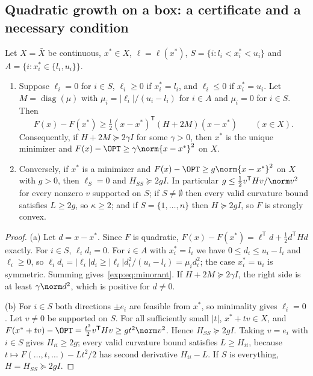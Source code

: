 \subsection{Quadratic growth on a box: a certificate and a necessary condition}

\begin{lemma}\label{exp:lem:growth}
Let $X=\bar X$ be continuous, $x^*\in X$, $\ell=\ell(x^*)$,
$S=\{i:l_i<x^*_i<u_i\}$ and $A=\{i:x^*_i\in\{l_i,u_i\}\}$.
\begin{enumerate}
\item[(a)] Suppose $\ell_i=0$ for $i\in S$, $\ell_i\ge0$ if $x_i^*=l_i$, and
$\ell_i\le0$ if $x^*_i=u_i$. Let $M=\operatorname{diag}(\mu)$ with
$\mu_i=|\ell_i|/(u_i-l_i)$ for $i\in A$ and $\mu_i=0$ for $i\in S$. Then
\begin{equation}\label{exp:eq:minorant}
F(x)-F(x^*)\ge\tfrac12(x-x^*)^{\mathsf T}(H+2M)(x-x^*)\qquad(x\in X).
\end{equation}
Consequently, if $H+2M\succeq2\gamma I$ for some $\gamma>0$, then $x^*$ is the
unique minimizer and $F(x)-\OPT\ge\gamma\norm{x-x^*}^2$ on $X$.
\item[(b)] Conversely, if $x^*$ is a minimizer and
$F(x)-\OPT\ge g\norm{x-x^*}^2$ on $X$ with $g>0$, then $\ell_S=0$ and
$H_{SS}\succeq2gI$. In particular $g\le\frac12v^{\mathsf T}Hv/\norm v^2$ for
every nonzero $v$ supported on $S$; if $S\ne\emptyset$ then every valid
curvature bound satisfies $L\ge2g$, so $\kappa\ge2$; and if $S=\{1,\dots,n\}$
then $H\succeq2gI$, so $F$ is strongly convex.
\end{enumerate}
\end{lemma}

\begin{proof}
(a) Let $d=x-x^*$. Since $F$ is quadratic,
$F(x)-F(x^*)=\ell^{\mathsf T}d+\frac12d^{\mathsf T}Hd$ exactly. For $i\in S$,
$\ell_id_i=0$. For $i\in A$ with $x_i^*=l_i$ we have $0\le d_i\le u_i-l_i$
and $\ell_i\ge0$, so $\ell_id_i=|\ell_i|d_i\ge|\ell_i|d_i^2/(u_i-l_i)=\mu_id_i^2$;
the case $x_i^*=u_i$ is symmetric. Summing gives~\eqref{exp:eq:minorant}. If
$H+2M\succeq2\gamma I$, the right side is at least $\gamma\norm d^2$, which is
positive for $d\ne0$.

(b) For $i\in S$ both directions $\pm e_i$ are feasible from $x^*$, so
minimality gives $\ell_i=0$. Let $v\ne0$ be supported on $S$. For all
sufficiently small $|t|$, $x^*+tv\in X$, and
$F(x^*+tv)-\OPT=\frac{t^2}2v^{\mathsf T}Hv\ge gt^2\norm v^2$. Hence
$H_{SS}\succeq2gI$. Taking $v=e_i$ with $i\in S$ gives $H_{ii}\ge2g$; every
valid curvature bound satisfies $L\ge H_{ii}$, because
$t\mapsto F(\dots,t,\dots)-Lt^2/2$ has second derivative $H_{ii}-L$. If
$S$ is everything, $H=H_{SS}\succeq2gI$.
\end{proof}

